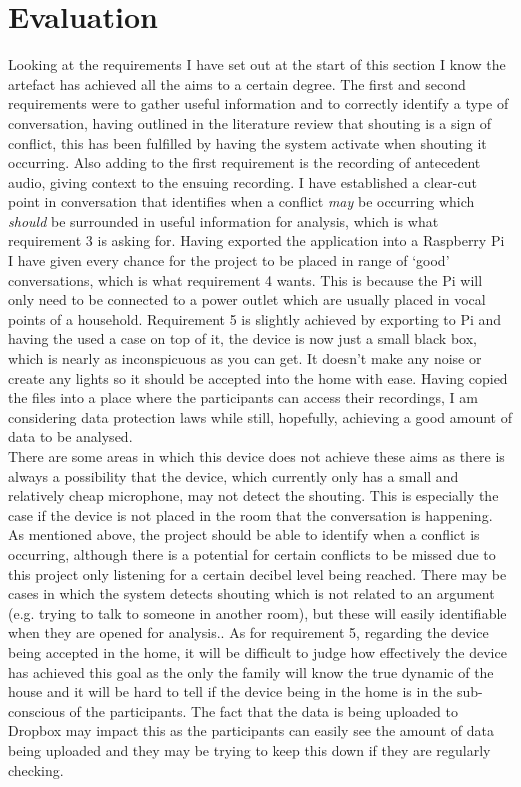 \documentclass[a4paper,11pt]{report}
\begin{document}
\section{Evaluation}
Looking at the requirements I have set out at the start of this section I know the artefact has achieved all the aims to a certain degree. The first and second requirements were to gather useful information and to correctly identify a type of conversation, having outlined in the literature review that shouting is a sign of conflict, this has been fulfilled by having the system activate when shouting it occurring. Also adding to the first requirement is the recording of antecedent audio, giving context to the ensuing recording. I have established a clear-cut point in conversation that identifies when a conflict \textit{may} be occurring which \textit{should} be surrounded in useful information for analysis, which is what requirement 3 is asking for. Having exported the application into a Raspberry Pi I have given every chance for the project to be placed in range of ‘good’ conversations, which is what requirement 4 wants. This is because the Pi will only need to be connected to a power outlet which are usually placed in vocal points of a household. Requirement 5 is slightly achieved by exporting to Pi and having the used a case on top of it, the device is now just a small black box, which is nearly as inconspicuous as you can get. It doesn’t make any noise or create any lights so it should be accepted into the home with ease. Having copied the files into a place where the participants can access their recordings, I am considering data protection laws while still, hopefully, achieving a good amount of data to be analysed.\\

There are some areas in which this device does not achieve these aims as there is always a possibility that the device, which currently only has a small and relatively cheap microphone, may not detect the shouting. This is especially the case if the device is not placed in the room that the conversation is happening. As mentioned above, the project should be able to identify when a conflict is occurring, although there is a potential for certain conflicts to be missed due to this project only listening for a certain decibel level being reached. There may be cases in which the system detects shouting which is not related to an argument (e.g. trying to talk to someone in another room), but these will easily identifiable when they are opened for analysis.. As for requirement 5, regarding the device being accepted in the home, it will be difficult to judge how effectively the device has achieved this goal as the only the family will know the true dynamic of the house and it will be hard to tell if the device being in the home is in the sub-conscious of the participants. The fact that the data is being uploaded to Dropbox may impact this as the participants can easily see the amount of data being uploaded and they may be trying to keep this down if they are regularly checking. 
\end{document}
